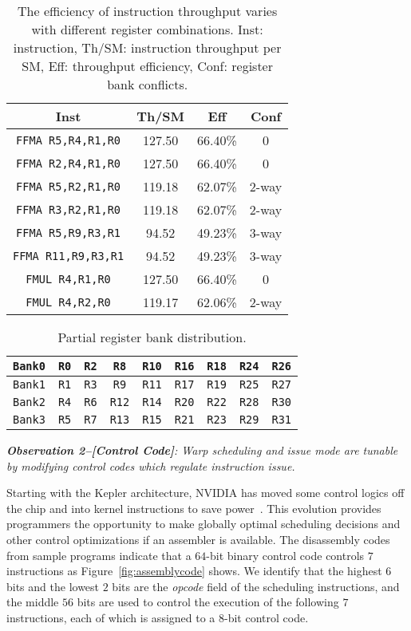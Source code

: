 \begin{table}[htbp]
    \caption{\small The efficiency of instruction throughput varies with different register combinations. Inst: instruction, Th/SM: instruction throughput per SM, Eff: throughput efficiency,  Conf: register bank conflicts.}
\centering
\scalebox{0.8} {
\begin{tabular}{|c|c|c|c|}
\hline
Inst &Th/SM&Eff&Conf\\
\hline
{\tt FFMA R5,R4,R1,R0}&127.50&66.40\%&0\\
\hline
{\tt FFMA R2,R4,R1,R0}&127.50&66.40\%&0\\
\hline
{\tt FFMA R5,R2,R1,R0}&119.18&62.07\%&2-way\\
\hline
{\tt FFMA R3,R2,R1,R0}&119.18&62.07\%&2-way\\
\hline
{\tt FFMA R5,R9,R3,R1}&94.52&49.23\%&3-way\\
\hline
{\tt FFMA R11,R9,R3,R1}&94.52&49.23\%&3-way\\
\hline
{\tt FMUL R4,R1,R0}&127.50&66.40\%&0\\
\hline
{\tt FMUL R4,R2,R0}&119.17&62.06\%&2-way\\
\hline
\end{tabular}
}
\label{tab:th}
\end{table}


\begin{table}[htbp]
\caption{\small Partial register bank distribution.}
\centering
\scalebox{0.8} {
\begin{tabular}{|c|c|c|c|c|c|c|c|c|}
\hline
    {\tt Bank0}&{\tt R0}&{\tt R2}&{\tt R8}&{\tt R10}&{\tt R16}&{\tt R18}&{\tt R24}&{\tt R26}\\
\hline
    {\tt Bank1}&{\tt R1}&{\tt R3}&{\tt R9}&{\tt R11}&{\tt R17}&{\tt R19}&{\tt R25}&{\tt R27} \\
\hline
    {\tt Bank2}&{\tt R4}&{\tt R6}&{\tt R12}&{\tt R14}&{\tt R20}&{\tt R22}&{\tt R28}&{\tt R30}\\
\hline
    {\tt Bank3}&{\tt R5}&{\tt R7}&{\tt R13}&{\tt R15}&{\tt R21}&{\tt R23}&{\tt R29}&{\tt R31}\\
\hline
\end{tabular}
}
\label{tab:reg}
\end{table}


{\em {\bf Observation 2--[Control Code]}:
Warp scheduling and issue mode are tunable by modifying control codes which regulate instruction issue.}

Starting with the Kepler architecture, NVIDIA has moved some control logics off the chip and into kernel
instructions to save power~\cite{lai,maxas}. 
This evolution provides programmers the opportunity to
make globally optimal scheduling decisions and other control optimizations if an assembler is available. 
The disassembly codes from sample programs indicate that a $64$-bit binary control code controls $7$ instructions as Figure~\ref{fig:assemblycode} shows.
We identify that the highest $6$ bits and the lowest $2$ bits are the {\em opcode} field of the scheduling instructions, and the middle $56$ bits are used to control the execution of the following $7$ instructions, each of which is assigned to a $8$-bit control code.


